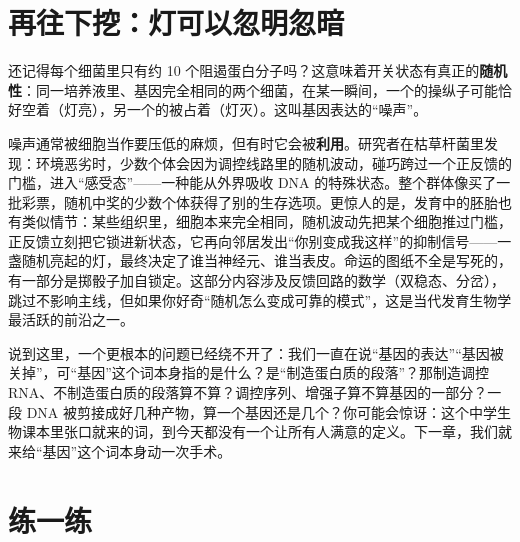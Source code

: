 \section{再往下挖：灯可以忽明忽暗}

\begin{tiaozhan}
还记得每个细菌里只有约 10 个阻遏蛋白分子吗？这意味着开关状态有真正的\textbf{随机性}：同一培养液里、基因完全相同的两个细菌，在某一瞬间，一个的操纵子可能恰好空着（灯亮），另一个的被占着（灯灭）。这叫基因表达的“噪声”。

噪声通常被细胞当作要压低的麻烦，但有时它会被\textbf{利用}。研究者在枯草杆菌里发现：环境恶劣时，少数个体会因为调控线路里的随机波动，碰巧跨过一个正反馈的门槛，进入“感受态”——一种能从外界吸收 DNA 的特殊状态。整个群体像买了一批彩票，随机中奖的少数个体获得了别的生存选项。更惊人的是，发育中的胚胎也有类似情节：某些组织里，细胞本来完全相同，随机波动先把某个细胞推过门槛，正反馈立刻把它锁进新状态，它再向邻居发出“你别变成我这样”的抑制信号——一盏随机亮起的灯，最终决定了谁当神经元、谁当表皮。命运的图纸不全是写死的，有一部分是掷骰子加自锁定。这部分内容涉及反馈回路的数学（双稳态、分岔），跳过不影响主线，但如果你好奇“随机怎么变成可靠的模式”，这是当代发育生物学最活跃的前沿之一。
\end{tiaozhan}

说到这里，一个更根本的问题已经绕不开了：我们一直在说“基因的表达”“基因被关掉”，可“基因”这个词本身指的是什么？是“制造蛋白质的段落”？那制造调控 RNA、不制造蛋白质的段落算不算？调控序列、增强子算不算基因的一部分？一段 DNA 被剪接成好几种产物，算一个基因还是几个？你可能会惊讶：这个中学生物课本里张口就来的词，到今天都没有一个让所有人满意的定义。下一章，我们就来给“基因”这个词本身动一次手术。

\section*{练一练}

